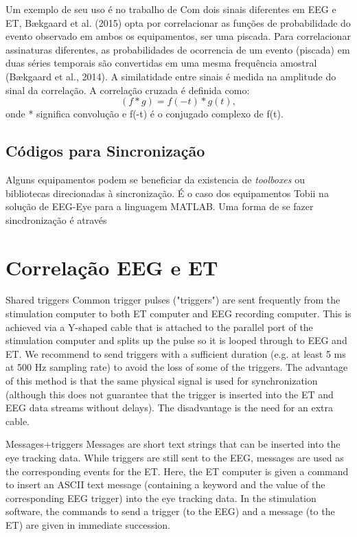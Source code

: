 Um exemplo de seu uso é no trabalho de Com dois sinais diferentes em EEG e ET, Bækgaard et al. (2015) opta por correlacionar as funções de probabilidade do evento observado em 
ambos os equipamentos, ser uma piscada. 
Para correlacionar assinaturas diferentes, as probabilidades de ocorrencia de um evento (piscada) em duas séries temporais são convertidas em uma mesma frequência amostral (Bækgaard et al., 2014).
A similatidade entre sinais é medida na amplitude do sinal da correlação. A correlação cruzada é definida como:
\begin{equation}\label{eq:correlação cruzada}
    (f * g) = f(-t)*g(t), 
    \end{equation}
onde * significa convolução e f(-t) é o conjugado complexo de f(t).






\subsection{Códigos para Sincronização}
Alguns equipamentos podem se beneficiar da existencia de \textit{toolboxes} ou bibliotecas direcionadas à sincronização. É o caso 
dos equipamentos Tobii na solução de EEG-Eye para a linguagem MATLAB. Uma forma de se fazer sincdronização é através 

\section{Correlação EEG e ET}

 Shared triggers
Common trigger pulses ("triggers") are sent frequently from the 
stimulation computer to both ET computer and EEG recording computer. 
This is achieved via a Y-shaped cable that is attached to the parallel 
port of the stimulation computer and splits up the pulse so it is looped through 
to EEG and ET. We recommend to send triggers with a sufficient duration 
(e.g. at least 5 ms at 500 Hz sampling rate) to avoid the loss of some of the triggers.
 The advantage of this method is that the same physical signal is used for 
 synchronization (although this does not guarantee that the trigger is
  inserted into the ET and EEG data streams without delays). The disadvantage
   is the need for an extra cable.

Messages+triggers
Messages are short text strings that can be inserted into the eye tracking data.
 While triggers are still sent to the EEG, messages are used as the corresponding 
 events for the ET. Here, the ET computer is given a command to insert an ASCII text 
 message (containing a keyword and the value of the corresponding EEG trigger) 
 into the eye tracking data. In the stimulation software, the commands to send a trigger
  (to the EEG) and a message (to the ET) are given in immediate succession. 


